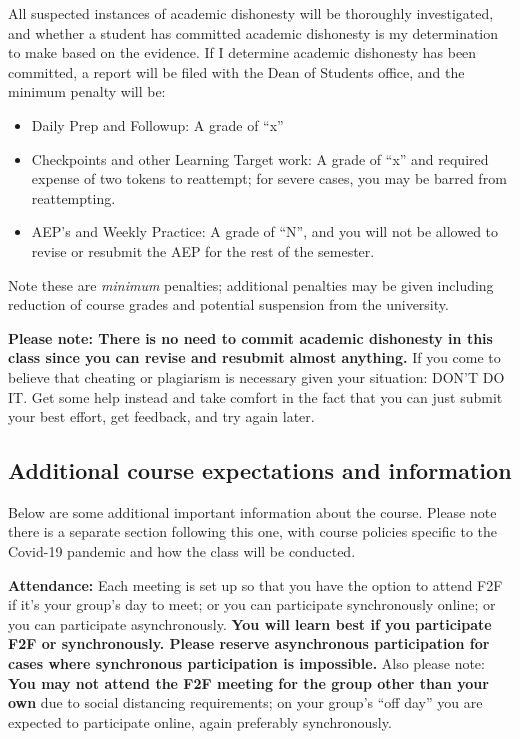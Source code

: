 \documentclass[]{article}
\providecommand{\tightlist}{%
  \setlength{\itemsep}{0pt}\setlength{\parskip}{0pt}}
\begin{document}
All suspected instances of academic dishonesty will be thoroughly
investigated, and whether a student has committed academic dishonesty is
my determination to make based on the evidence. If I determine academic
dishonesty has been committed, a report will be filed with the Dean of
Students office, and the minimum penalty will be:

\begin{itemize}
\tightlist
\item
  Daily Prep and Followup: A grade of ``x''
\item
  Checkpoints and other Learning Target work: A grade of ``x'' and
  required expense of two tokens to reattempt; for severe cases, you may
  be barred from reattempting.
\item
  AEP's and Weekly Practice: A grade of ``N'', and you will not be
  allowed to revise or resubmit the AEP for the rest of the semester.
\end{itemize}

Note these are \emph{minimum} penalties; additional penalties may be
given including reduction of course grades and potential suspension from
the university.

\textbf{Please note: There is no need to commit academic dishonesty in
this class since you can revise and resubmit almost anything.} If you
come to believe that cheating or plagiarism is necessary given your
situation: DON'T DO IT. Get some help instead and take comfort in the
fact that you can just submit your best effort, get feedback, and try
again later.

\hypertarget{additional-course-expectations-and-information}{%
\subsection{Additional course expectations and
information}\label{additional-course-expectations-and-information}}

Below are some additional important information about the course. Please
note there is a separate section following this one, with course
policies specific to the Covid-19 pandemic and how the class will be
conducted.

\textbf{Attendance:} Each meeting is set up so that you have the option
to attend F2F if it's your group's day to meet; or you can participate
synchronously online; or you can participate asynchronously. \textbf{You
will learn best if you participate F2F or synchronously. Please reserve
asynchronous participation for cases where synchronous participation is
impossible.} Also please note: \textbf{You may not attend the F2F
meeting for the group other than your own} due to social distancing
requirements; on your group's ``off day'' you are expected to
participate online, again preferably synchronously.
\end{document}
